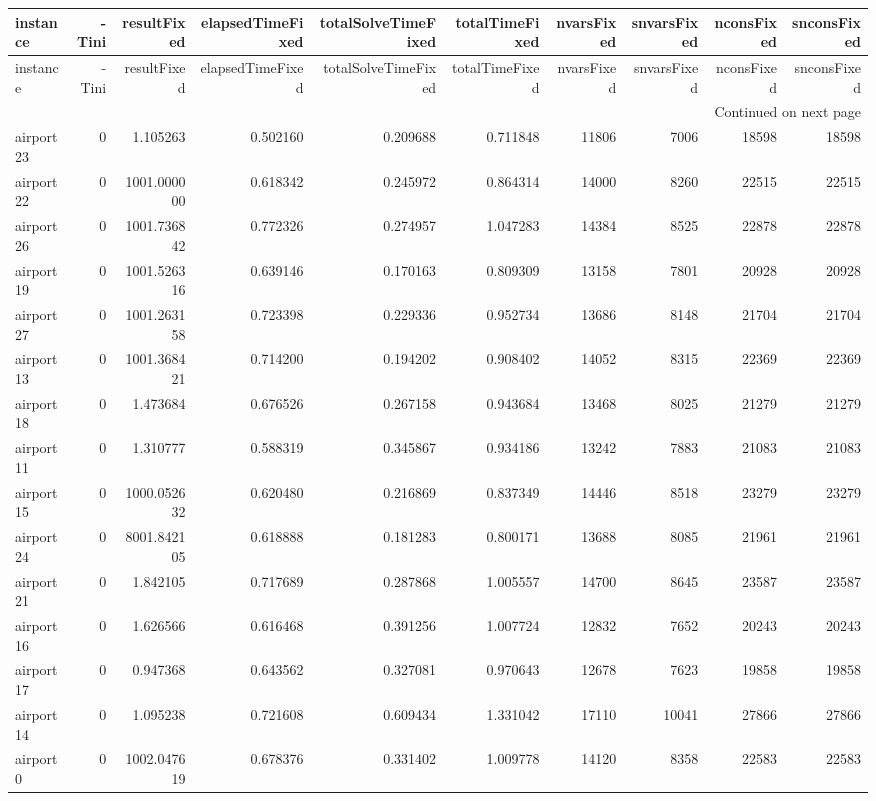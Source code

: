 \begin{longtable}{|l|r|r|r|r|r|r|r|r|r|}
\toprule
instance & -Tini & resultFixed & elapsedTimeFixed & totalSolveTimeFixed & totalTimeFixed & nvarsFixed & snvarsFixed & nconsFixed & snconsFixed \\
\midrule
\endfirsthead
\toprule
instance & -Tini & resultFixed & elapsedTimeFixed & totalSolveTimeFixed & totalTimeFixed & nvarsFixed & snvarsFixed & nconsFixed & snconsFixed \\
\midrule
\endhead
\midrule
\multicolumn{10}{r}{Continued on next page} \\
\midrule
\endfoot
\bottomrule
\endlastfoot
airport23 & 0 & 1.105263 & 0.502160 & 0.209688 & 0.711848 & 11806 & 7006 & 18598 & 18598 \\
airport22 & 0 & 1001.000000 & 0.618342 & 0.245972 & 0.864314 & 14000 & 8260 & 22515 & 22515 \\
airport26 & 0 & 1001.736842 & 0.772326 & 0.274957 & 1.047283 & 14384 & 8525 & 22878 & 22878 \\
airport19 & 0 & 1001.526316 & 0.639146 & 0.170163 & 0.809309 & 13158 & 7801 & 20928 & 20928 \\
airport27 & 0 & 1001.263158 & 0.723398 & 0.229336 & 0.952734 & 13686 & 8148 & 21704 & 21704 \\
airport13 & 0 & 1001.368421 & 0.714200 & 0.194202 & 0.908402 & 14052 & 8315 & 22369 & 22369 \\
airport18 & 0 & 1.473684 & 0.676526 & 0.267158 & 0.943684 & 13468 & 8025 & 21279 & 21279 \\
airport11 & 0 & 1.310777 & 0.588319 & 0.345867 & 0.934186 & 13242 & 7883 & 21083 & 21083 \\
airport15 & 0 & 1000.052632 & 0.620480 & 0.216869 & 0.837349 & 14446 & 8518 & 23279 & 23279 \\
airport24 & 0 & 8001.842105 & 0.618888 & 0.181283 & 0.800171 & 13688 & 8085 & 21961 & 21961 \\
airport21 & 0 & 1.842105 & 0.717689 & 0.287868 & 1.005557 & 14700 & 8645 & 23587 & 23587 \\
airport16 & 0 & 1.626566 & 0.616468 & 0.391256 & 1.007724 & 12832 & 7652 & 20243 & 20243 \\
airport17 & 0 & 0.947368 & 0.643562 & 0.327081 & 0.970643 & 12678 & 7623 & 19858 & 19858 \\
airport14 & 0 & 1.095238 & 0.721608 & 0.609434 & 1.331042 & 17110 & 10041 & 27866 & 27866 \\
airport0 & 0 & 1002.047619 & 0.678376 & 0.331402 & 1.009778 & 14120 & 8358 & 22583 & 22583 \\

\end{longtable}
